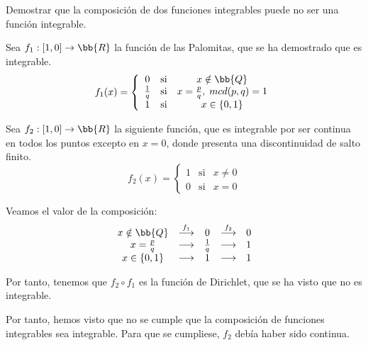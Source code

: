 \begin{ejercicio}
    Demostrar que la composición de dos funciones integrables puede no ser una función integrable.

    Sea $f_1:[1,0]\to \bb{R}$ la función de las Palomitas, que se ha demostrado que es integrable.
    \begin{equation*}
        f_1(x) = \left\{\begin{array}{ccc}
            0 & \text{si} & x\notin \bb{Q}\\
            \frac{1}{q} & \text{si} & x=\frac{p}{q},\;mcd(p,q)=1\\
            1 & \text{si} & x\in \{0,1\}
        \end{array} \right.
    \end{equation*}


    Sea $f_2:[1,0]\to \bb{R}$ la siguiente función, que es integrable por ser continua en todos los puntos excepto en $x=0$, donde presenta una discontinuidad de salto finito.
    \begin{equation*}
        f_2(x) = \left\{\begin{array}{ccc}
            1 & \text{si} & x\neq 0\\
            0 & \text{si} & x=0
        \end{array} \right.
    \end{equation*}

    Veamos el valor de la composición:
    \begin{equation*}
        \begin{array}{ccccc}
            x\notin \bb{Q} & \stackrel{f_1}{\longrightarrow} & 0 &\stackrel{f_2}{\longrightarrow} & 0\\
            x=\frac{p}{q} & \longrightarrow  & \frac{1}{q} & \longrightarrow  & 1 \\
            x \in \{0,1\} & \longrightarrow & 1& \longrightarrow  & 1
        \end{array}
    \end{equation*}


    Por tanto, tenemos que $f_2\circ f_1$ es la función de Dirichlet, que se ha visto que no es integrable.

    Por tanto, hemos visto que no se cumple que la composición de funciones integrables sea integrable. Para que se cumpliese, $f_2$ debía haber sido continua.

    

\end{ejercicio}

